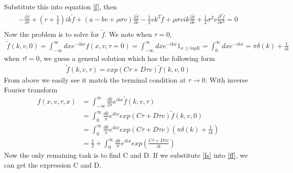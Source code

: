\documentclass[a4paper]{article}
\begin{document}
Substitute this into equation \ref{f}, then
\begin{align} \label{ff}
	-\frac{\partial \tilde f}{\partial \tau}
	+ (r + \frac{1}{2})ik \tilde f 
	+ (a-bv+\rho \sigma v)\frac{\partial \tilde f}{\partial v}
        -\frac{1}{2}vk^2 \tilde f 
	+ \rho \sigma v ik \frac{\partial \tilde f}{\partial v}
        +\frac{1}{2} \sigma^2 v \frac{\partial^2 \tilde f}{\partial v^2}  = 0\\
\end{align}
Now the problem is to solve for $\tilde f$. We note when $\tau=0$,
\begin{align*}
	\tilde f(k, v, 0) = \int_{-\infty}^{\infty}dx e^{-ikx}f(x, v, \tau=0)
			  = \int_{-\infty}^{\infty}dx e^{-ikx}1_{x \geq logK}
			     = \int_{0}^{\infty}dx e^{-ikx}
			     = \pi \delta(k) + \frac{1}{ik}
\end{align*}
when $\tau!=0$, we guess a general solution which has the following form
\begin{align*}
	\tilde f(k, v, \tau) = exp(C\tau +D\tau v) \tilde f(k,v,0)
\end{align*}
From above we easily see it match the terminal condition at $\tau \to 0$. With inverse Fourier transform
\begin{align} \label{fs}
	f(x, v, \tau, x) & = \int_{-\infty}^{\infty}\frac{dk}{2\pi} e^{ikx} \tilde f(k, v, \tau)\\
			 & = \int_{0}^{\infty}\frac{dk}{\pi} e^{ikx} exp(C\tau + D\tau v) \tilde f(k, v, 0)\\
			 & = \int_{0}^{\infty}\frac{dk}{\pi} e^{ikx} exp(C\tau + D\tau v) 
			 	(\pi \delta(k) + \frac{1}{ik}) \\
			 & = \frac{1}{2} + \int_{0}^{\infty}\frac{dk}{\pi} e^{ikx} exp(\frac{C\tau + D\tau v}{ik}) 
\end{align}
Now the only remaining task is to find C and D. If we substitute \ref{fs} into \ref{ff}, we can get the expression C and D. 
\end{document}
